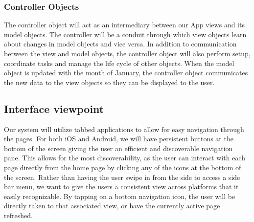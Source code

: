 \documentclass[letterpaper,10pt,draftclsnofoot,onecolumn,titlepage]{IEEEtran}
\begin{document}
			\subsubsection{Controller Objects}
				The controller object will act as an intermediary between our \gls{App} views and its model objects.
				The controller will be a conduit through which view objects learn about changes in model objects and vice versa.
				In addition to communication between the view and model objects, the controller object will also perform setup, coordinate tasks and manage the life cycle of other objects.
				When the model object is updated with the month of January, the controller object communicates the new data to the view objects so they can be displayed to the user.


		\subsection{Interface viewpoint}
			Our system will utilize tabbed applications to allow for easy navigation through the pages.
			For both \gls{iOS} and \gls{Android}, we will have persistent buttons at the bottom of the screen giving the user an efficient and discoverable navigation pane.
			This allows for the most discoverability, as the user can interact with each page directly from the home page by clicking any of the icons at the bottom of the screen.
			Rather than having the user swipe in from the side to access a side bar menu, we want to give the users a consistent view across platforms that it easily recognizable.
			By tapping on a bottom navigation icon, the user will be directly taken to that associated view, or have the currently active page refreshed.
\end{document}
